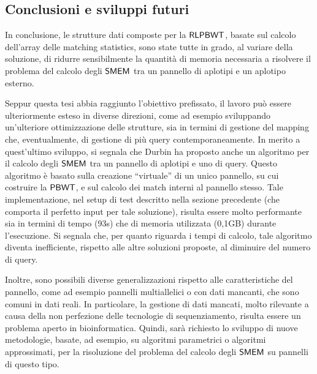 \documentclass[a4paper,11pt, oneside,italian]{article}
\def\PBWT{\mbox{\rm {\sf PBWT}}}
\def\RLPBWT{\mbox{\rm {\sf RLPBWT}}}
\def\SMEM{\mbox{\rm {\sf SMEM}}}
\begin{document}
\subsection*{Conclusioni e sviluppi futuri}
In conclusione, le strutture dati composte per la $\RLPBWT$, basate sul calcolo
dell'array delle matching statistics, sono state tutte in
grado, al variare della soluzione, di ridurre sensibilmente la 
quantità di memoria necessaria a risolvere il problema del calcolo degli $\SMEM$
tra un pannello di aplotipi e un aplotipo esterno.  

Seppur questa tesi abbia raggiunto l'obiettivo prefissato, il lavoro può essere
ulteriormente esteso in diverse direzioni, come ad esempio sviluppando
un'ulteriore ottimizzazione delle strutture, sia in termini 
di gestione del mapping che, eventualmente, di gestione di più query
contemporaneamente. In merito a quest'ultimo sviluppo, si segnala che Durbin
ha proposto anche un algoritmo per il calcolo degli $\SMEM$ tra un pannello di
aplotipi e uno di query. Questo algoritmo è basato sulla creazione ``virtuale''
di un unico pannello, su cui 
costruire la $\PBWT$, e sul calcolo dei match interni al pannello stesso. Tale
implementazione, nel setup di test 
descritto nella sezione precedente (che comporta il perfetto input per
tale soluzione), risulta essere molto performante sia in
termini di tempo (93s) che di memoria utilizzata (0,1GB) durante
l'esecuzione. Si segnala che, per quanto riguarda i tempi di calcolo, tale
algoritmo diventa inefficiente, rispetto alle altre soluzioni proposte, al
diminuire del numero di query. 

Inoltre, sono possibili diverse generalizzazioni rispetto alle caratteristiche
del pannello, come ad esempio pannelli multiallelici o con dati mancanti, che
sono comuni in dati reali. In particolare, la gestione 
di dati 
mancati, molto rilevante a causa della non perfezione delle tecnologie di
sequenziamento, risulta essere un problema aperto in bioinformatica. Quindi,
sarà richiesto lo sviluppo di nuove metodologie, basate, ad esempio,
su algoritmi parametrici o algoritmi approssimati, per la risoluzione del
problema del calcolo degli $\SMEM$ su pannelli di questo tipo.
\end{document}

